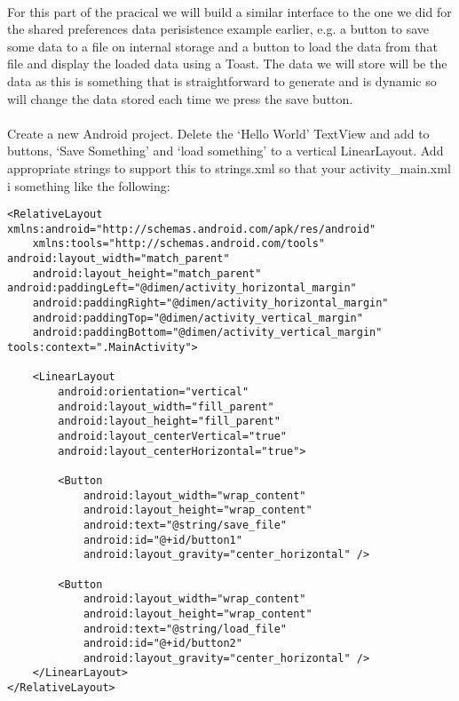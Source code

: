 \paragraph{} For this part of the pracical we will build a similar interface to the one we did for the shared preferences data perisistence example earlier, e.g. a button to save some data to a file on internal storage and a button to load the data from that file and display the loaded data using a Toast. The data we will store will be the data as this is something that is straightforward to generate and is dynamic so will change the data stored each time we press the save button.

\paragraph{} Create a new Android project. Delete the `Hello World' TextView and add to buttons, `Save Something' and `load something' to a vertical LinearLayout. Add appropriate strings to support this to strings.xml so that your activity\_main.xml i something like the following:

\begin{lstlisting}
<RelativeLayout xmlns:android="http://schemas.android.com/apk/res/android"
    xmlns:tools="http://schemas.android.com/tools" android:layout_width="match_parent"
    android:layout_height="match_parent" android:paddingLeft="@dimen/activity_horizontal_margin"
    android:paddingRight="@dimen/activity_horizontal_margin"
    android:paddingTop="@dimen/activity_vertical_margin"
    android:paddingBottom="@dimen/activity_vertical_margin" tools:context=".MainActivity">

    <LinearLayout
        android:orientation="vertical"
        android:layout_width="fill_parent"
        android:layout_height="fill_parent"
        android:layout_centerVertical="true"
        android:layout_centerHorizontal="true">

        <Button
            android:layout_width="wrap_content"
            android:layout_height="wrap_content"
            android:text="@string/save_file"
            android:id="@+id/button1"
            android:layout_gravity="center_horizontal" />

        <Button
            android:layout_width="wrap_content"
            android:layout_height="wrap_content"
            android:text="@string/load_file"
            android:id="@+id/button2"
            android:layout_gravity="center_horizontal" />
    </LinearLayout>
</RelativeLayout>
\end{lstlisting}

